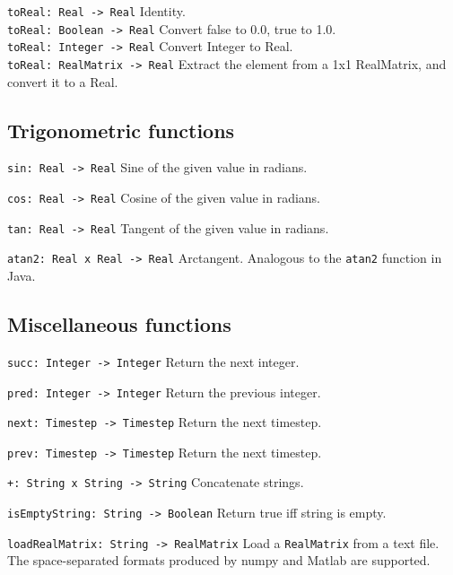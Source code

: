 \verb|toReal: Real -> Real| Identity. \\
\verb|toReal: Boolean -> Real| Convert false to 0.0, true to 1.0. \\
\verb|toReal: Integer -> Real| Convert Integer to Real. \\
\verb|toReal: RealMatrix -> Real| Extract the element from a 1x1 RealMatrix,
and convert it to a Real.


\subsection{Trigonometric functions}
\label{sec:builtin-trig}

\verb|sin: Real -> Real| Sine of the given value in radians.

\verb|cos: Real -> Real| Cosine of the given value in radians.

\verb|tan: Real -> Real| Tangent of the given value in radians.

\verb|atan2: Real x Real -> Real| Arctangent. Analogous to the \verb|atan2|
function in Java.


\subsection{Miscellaneous functions}
\label{sec:builtin-misc}

\verb|succ: Integer -> Integer| Return the next integer.

\verb|pred: Integer -> Integer| Return the previous integer.

\verb|next: Timestep -> Timestep| Return the next timestep.

\verb|prev: Timestep -> Timestep| Return the next timestep.

\verb|+: String x String -> String| Concatenate strings.

\verb|isEmptyString: String -> Boolean| Return true iff string is empty.

\verb|loadRealMatrix: String -> RealMatrix| Load a \verb|RealMatrix| from a
text file. The space-separated formats produced by numpy and Matlab are
supported.


